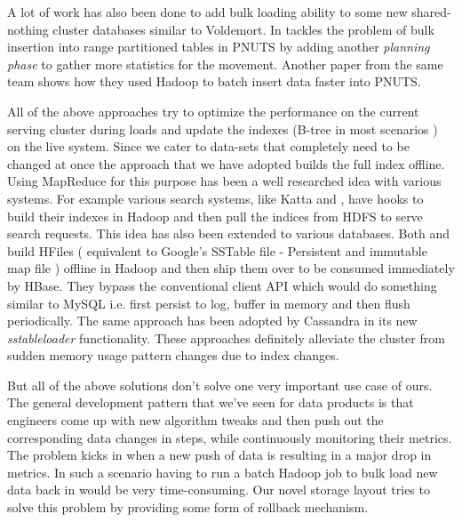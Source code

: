 \documentclass[10pt,twocolumn,preprint,natbib,authoryear]{sigplanconf}
\begin{document}
A lot of work has also been done to add bulk loading ability to some new shared-nothing cluster\cite{The Case for Shared Nothing Database} databases similar to Voldemort. In \cite{8 - Efﬁcient Bulk Insertion into a Distributed Ordered Table} tackles the problem of bulk insertion into range partitioned tables in PNUTS \cite{9 - PNUTS paper} by adding another \emph {planning phase} to gather more statistics for the movement. Another paper from the same team \cite{A Batch of PNUTS: Experiences Connecting Cloud Batch and Serving Systems} shows how they used Hadoop to batch insert data faster into PNUTS.

All of the above approaches try to optimize the performance on the current serving cluster during loads and update the indexes (B-tree in most scenarios ) on the live system. Since we cater to data-sets that completely need to be changed at once the approach that we have adopted builds the full index offline. Using MapReduce for this purpose has been a well researched idea with various systems. For example various search systems, like Katta\cite{10 - Katta link} and \cite{Distributed Indexing for Semantic Search}, have hooks to build their indexes in Hadoop and then pull the indices from HDFS to serve search requests. This idea has also been extended to various databases. Both \cite{11 - Distributed Indexing of Web Scale Datasets for the Cloud} and \cite{Parallel Bulk Insertion for Large-scale Analytics Applications} build HFiles ( equivalent to Google's SSTable file - Persistent and immutable map file ) offline in Hadoop and then ship them over to be consumed immediately by HBase. They bypass the conventional client API which would do something similar to MySQL i.e. first persist to log, buffer in memory and then flush periodically. The same approach has been adopted by Cassandra in its new \emph{sstableloader}\cite{http://www.datastax.com/dev/blog/bulk-loading} functionality. These approaches definitely alleviate the cluster from sudden memory usage pattern changes due to index changes. 

But all of the above solutions don't solve one very important use case of ours. The general development pattern that we've seen for data products is that engineers come up with new algorithm tweaks and then push out the corresponding data changes in steps, while continuously monitoring their metrics. The problem kicks in when a new push of data is resulting in a major drop in metrics. In such a scenario having to run a batch Hadoop job to bulk load new data back in would be very time-consuming. Our novel storage layout tries to solve this problem by providing some form of rollback mechanism. 
 
\end{document}
